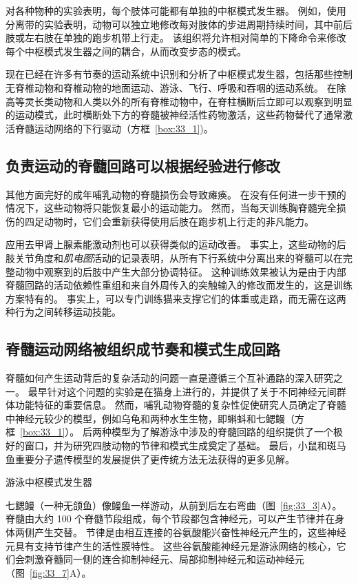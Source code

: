 对各种物种的实验表明，每个肢体可能都有单独的中枢模式发生器。
例如，使用分离带的实验表明，动物可以独立地修改每对肢体的步进周期持续时间，其中前后肢或左右肢在单独的跑步机带上行走。
该组织将允许相对简单的下降命令来修改每个中枢模式发生器之间的耦合，从而改变步态的模式。


现在已经在许多有节奏的运动系统中识别和分析了中枢模式发生器，包括那些控制无脊椎动物和脊椎动物的地面运动、游泳、飞行、呼吸和吞咽的运动系统。
在除高等灵长类动物和人类以外的所有脊椎动物中，在脊柱横断后立即可以观察到明显的运动模式，此时横断处下方的脊髓被神经活性药物激活，这些药物替代了通常激活脊髓运动网络的下行驱动（方框~\ref{box:33_1})。



\subsection{负责运动的脊髓回路可以根据经验进行修改}

其他方面完好的成年哺乳动物的脊髓损伤会导致瘫痪。
在没有任何进一步干预的情况下，这些动物将只能恢复最小的运动能力。
然而，当每天训练胸脊髓完全损伤的四足动物时，它们会重新获得使用后肢在跑步机上行走的非凡能力。


应用去甲肾上腺素能激动剂也可以获得类似的运动改善。
事实上，这些动物的后肢关节角度和\textit{肌电图}活动的记录表明，从所有下行系统中分离出来的脊髓可以在完整动物中观察到的后肢中产生大部分协调特征。
这种训练效果被认为是由于内部脊髓回路的活动依赖性重组和来自外周传入的突触输入的修改而发生的，这是训练方案特有的。
事实上，可以专门训练猫来支撑它们的体重或走路，而无需在这两种行为之间转移运动技能。



\subsection{脊髓运动网络被组织成节奏和模式生成回路}

脊髓如何产生运动背后的复杂活动的问题一直是遵循三个互补通路的深入研究之一。
最早针对这个问题的实验是在猫身上进行的，并提供了关于不同神经元间群体功能特征的重要信息。
然而，哺乳动物脊髓的复杂性促使研究人员确定了脊髓中神经元较少的模型，例如乌龟和两种水生生物，即蝌蚪和七鳃鳗（方框~\ref{box:33_1}）。
后两种模型为了解游泳中涉及的脊髓回路的组织提供了一个极好的窗口，并为研究四肢动物的节律和模式生成奠定了基础。
最后，小鼠和斑马鱼重要分子遗传模型的发展提供了更传统方法无法获得的更多见解。


游泳中枢模式发生器

七鳃鳗（一种无颌鱼）像鳗鱼一样游动，从前到后左右弯曲（图~\ref{fig:33_3}A）。
脊髓由大约 100 个脊髓节段组成，每个节段都包含神经元，可以产生节律并在身体两侧产生交替。
节律是由相互连接的谷氨酸能兴奋性神经元产生的，这些神经元具有支持节律产生的活性膜特性。
这些谷氨酸能神经元是游泳网络的核心，它们会刺激脊髓同一侧的连合抑制神经元、局部抑制神经元和运动神经元（图~\ref{fig:33_7}A）。


